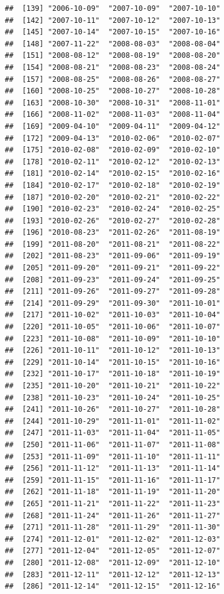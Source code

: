 \documentclass[10pt]{article}\usepackage[]{graphicx}\usepackage[]{color}
\makeatletter
\newenvironment{kframe}{%
 \def\at@end@of@kframe{}%
 \ifinner\ifhmode%
  \def\at@end@of@kframe{\end{minipage}}%
  \begin{minipage}{\columnwidth}%
 \fi\fi%
 \def\FrameCommand##1{\hskip\@totalleftmargin \hskip-\fboxsep
 \colorbox{shadecolor}{##1}\hskip-\fboxsep
     \hskip-\linewidth \hskip-\@totalleftmargin \hskip\columnwidth}%
 \MakeFramed {\advance\hsize-\width
   \@totalleftmargin\z@ \linewidth\hsize
   \@setminipage}}%
 {\par\unskip\endMakeFramed%
 \at@end@of@kframe}
\newenvironment{knitrout}{}{} %
\theoremstyle{plain}
\makeatother
\begin{document}
\begin{knitrout}
\begin{kframe}
\begin{verbatim}
##  [139] "2006-10-09"  "2007-10-09"  "2007-10-10" 
##  [142] "2007-10-11"  "2007-10-12"  "2007-10-13" 
##  [145] "2007-10-14"  "2007-10-15"  "2007-10-16" 
##  [148] "2007-11-22"  "2008-08-03"  "2008-08-04" 
##  [151] "2008-08-12"  "2008-08-19"  "2008-08-20" 
##  [154] "2008-08-21"  "2008-08-23"  "2008-08-24" 
##  [157] "2008-08-25"  "2008-08-26"  "2008-08-27" 
##  [160] "2008-10-25"  "2008-10-27"  "2008-10-28" 
##  [163] "2008-10-30"  "2008-10-31"  "2008-11-01" 
##  [166] "2008-11-02"  "2008-11-03"  "2008-11-04" 
##  [169] "2009-04-10"  "2009-04-11"  "2009-04-12" 
##  [172] "2009-04-13"  "2010-02-06"  "2010-02-07" 
##  [175] "2010-02-08"  "2010-02-09"  "2010-02-10" 
##  [178] "2010-02-11"  "2010-02-12"  "2010-02-13" 
##  [181] "2010-02-14"  "2010-02-15"  "2010-02-16" 
##  [184] "2010-02-17"  "2010-02-18"  "2010-02-19" 
##  [187] "2010-02-20"  "2010-02-21"  "2010-02-22" 
##  [190] "2010-02-23"  "2010-02-24"  "2010-02-25" 
##  [193] "2010-02-26"  "2010-02-27"  "2010-02-28" 
##  [196] "2010-08-23"  "2011-02-26"  "2011-08-19" 
##  [199] "2011-08-20"  "2011-08-21"  "2011-08-22" 
##  [202] "2011-08-23"  "2011-09-06"  "2011-09-19" 
##  [205] "2011-09-20"  "2011-09-21"  "2011-09-22" 
##  [208] "2011-09-23"  "2011-09-24"  "2011-09-25" 
##  [211] "2011-09-26"  "2011-09-27"  "2011-09-28" 
##  [214] "2011-09-29"  "2011-09-30"  "2011-10-01" 
##  [217] "2011-10-02"  "2011-10-03"  "2011-10-04" 
##  [220] "2011-10-05"  "2011-10-06"  "2011-10-07" 
##  [223] "2011-10-08"  "2011-10-09"  "2011-10-10" 
##  [226] "2011-10-11"  "2011-10-12"  "2011-10-13" 
##  [229] "2011-10-14"  "2011-10-15"  "2011-10-16" 
##  [232] "2011-10-17"  "2011-10-18"  "2011-10-19" 
##  [235] "2011-10-20"  "2011-10-21"  "2011-10-22" 
##  [238] "2011-10-23"  "2011-10-24"  "2011-10-25" 
##  [241] "2011-10-26"  "2011-10-27"  "2011-10-28" 
##  [244] "2011-10-29"  "2011-11-01"  "2011-11-02" 
##  [247] "2011-11-03"  "2011-11-04"  "2011-11-05" 
##  [250] "2011-11-06"  "2011-11-07"  "2011-11-08" 
##  [253] "2011-11-09"  "2011-11-10"  "2011-11-11" 
##  [256] "2011-11-12"  "2011-11-13"  "2011-11-14" 
##  [259] "2011-11-15"  "2011-11-16"  "2011-11-17" 
##  [262] "2011-11-18"  "2011-11-19"  "2011-11-20" 
##  [265] "2011-11-21"  "2011-11-22"  "2011-11-23" 
##  [268] "2011-11-24"  "2011-11-26"  "2011-11-27" 
##  [271] "2011-11-28"  "2011-11-29"  "2011-11-30" 
##  [274] "2011-12-01"  "2011-12-02"  "2011-12-03" 
##  [277] "2011-12-04"  "2011-12-05"  "2011-12-07" 
##  [280] "2011-12-08"  "2011-12-09"  "2011-12-10" 
##  [283] "2011-12-11"  "2011-12-12"  "2011-12-13" 
##  [286] "2011-12-14"  "2011-12-15"  "2011-12-16" 

\end{verbatim}
\end{kframe}
\end{knitrout}
\end{document}
